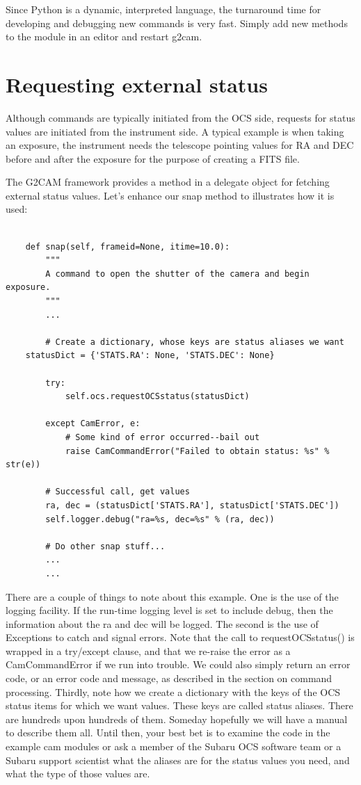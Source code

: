 \documentclass[11pt]{report}
\begin{document}
Since Python is a dynamic, interpreted language, the turnaround time for
developing and debugging new commands is very fast. Simply add new
methods to the module in an editor and restart g2cam. 

\section{Requesting external status}
Although commands are typically initiated from the OCS side, requests
for status values are initiated from the instrument side. A typical
example is when taking an exposure, the instrument needs the telescope
pointing values for RA and DEC before and after the exposure for the
purpose of creating a FITS file. 

The G2CAM framework provides a method in a delegate object for fetching
external status values. Let's enhance our snap method to illustrates how
it is used: 
\begin{verbatim}

    def snap(self, frameid=None, itime=10.0):
        """
        A command to open the shutter of the camera and begin exposure.
        """
        ...
        
        # Create a dictionary, whose keys are status aliases we want
	statusDict = {'STATS.RA': None, 'STATS.DEC': None}

        try:
            self.ocs.requestOCSstatus(statusDict)

        except CamError, e:
            # Some kind of error occurred--bail out
            raise CamCommandError("Failed to obtain status: %s" % str(e))

        # Successful call, get values
        ra, dec = (statusDict['STATS.RA'], statusDict['STATS.DEC'])
        self.logger.debug("ra=%s, dec=%s" % (ra, dec))

        # Do other snap stuff...
        ...
        ...

\end{verbatim}
There are a couple of things to note about this example. One is the use
of the logging facility. If the run-time logging level is set to include
debug, then the information about the ra and dec will be logged. The
second is the use of Exceptions to catch and signal errors. Note that
the call to requestOCSstatus() is wrapped in a try/except clause, and
that we re-raise the error as a CamCommandError if we run into
trouble. We could also simply return an error code, or an error code and
message, as described in the section on command processing. Thirdly,
note how we create a dictionary with the keys of the OCS status items
for which we want values. These keys are called status aliases. There
are hundreds upon hundreds of them. Someday hopefully we will have a
manual to describe them all. Until then, your best bet is to examine the
code in the example cam modules or ask a member of the Subaru OCS
software team or a Subaru support scientist what the aliases are for the
status values you need, and what the type of those values are. 
\end{document}
